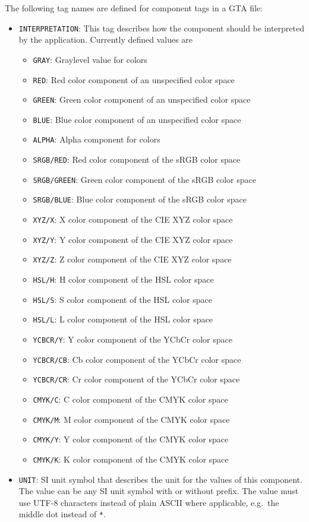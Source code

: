 \documentclass[a4paper,11pt]{article}
\newcommand{\code}[1]{\texttt{#1}}
\begin{document}
The following tag names are defined for component tags in a GTA file:
\begin{itemize}
\item \code{INTERPRETATION}: This tag describes how the component should be
interpreted by the application. Currently defined values are
	\begin{itemize}
	\item \code{GRAY}: Graylevel value for colors
	\item \code{RED}: Red color component of an unspecified color space
	\item \code{GREEN}: Green color component of an unspecified color space
	\item \code{BLUE}: Blue color component of an unspecified color space
	\item \code{ALPHA}: Alpha component for colors
	\item \code{SRGB/RED}: Red color component of the sRGB color space
	\item \code{SRGB/GREEN}: Green color component of the sRGB color space
	\item \code{SRGB/BLUE}: Blue color component of the sRGB color space
	\item \code{XYZ/X}: X color component of the CIE XYZ color space
	\item \code{XYZ/Y}: Y color component of the CIE XYZ color space
	\item \code{XYZ/Z}: Z color component of the CIE XYZ color space
	\item \code{HSL/H}: H color component of the HSL color space
	\item \code{HSL/S}: S color component of the HSL color space
	\item \code{HSL/L}: L color component of the HSL color space
	\item \code{YCBCR/Y}: Y color component of the YCbCr color space
	\item \code{YCBCR/CB}: Cb color component of the YCbCr color space
	\item \code{YCBCR/CR}: Cr color component of the YCbCr color space
	\item \code{CMYK/C}: C color component of the CMYK color space
	\item \code{CMYK/M}: M color component of the CMYK color space
	\item \code{CMYK/Y}: Y color component of the CMYK color space
	\item \code{CMYK/K}: K color component of the CMYK color space
	\end{itemize}
\item \code{UNIT}: SI unit symbol that describes the unit for the values of
this component. The value can be any SI unit symbol with or without prefix.
The value must use UTF-8 characters instead of plain ASCII where applicable,
e.g.~the middle dot instead of \code{*}.
\end{itemize}
\end{document}
